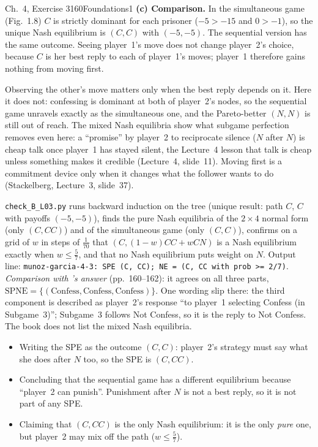 \begin{exsol}{\MG{} Ch.~4, Exercise 3}{160}{Foundations}{1}
\textbf{(c) Comparison.} In the simultaneous game (Fig.~1.8) $C$ is strictly dominant for each
prisoner ($-5 > -15$ and $0 > -1$), so the unique Nash equilibrium is $(C,C)$ with $(-5,-5)$. The
sequential version has the same outcome. Seeing player~1's move does not change player~2's
choice, because $C$ is her best reply to each of player~1's moves; player~1 therefore gains
nothing from moving first.

\interp Observing the other's move matters only when the best reply depends on it. Here it does
not: confessing is dominant at both of player~2's nodes, so the sequential game unravels exactly
as the simultaneous one, and the Pareto-better $(N,N)$ is still out of reach. The mixed Nash
equilibria show what subgame perfection removes even here: a ``promise'' by player~2 to
reciprocate silence ($N$ after $N$) is cheap talk once player~1 has stayed silent, the Lecture~4
lesson that talk is cheap unless something makes it credible (Lecture~4, slide~11). Moving first
is a commitment device only when it changes what the follower wants to do (Stackelberg,
Lecture~3, slide~37).

\verify \texttt{check\_B\_L03.py} runs backward induction on the tree (unique result: path
$C$, $C$ with payoffs $(-5,-5)$), finds the pure Nash equilibria of the $2\times4$ normal form (only
$(C, CC)$) and of the simultaneous game (only $(C,C)$), confirms on a grid of $w$ in steps of
$\frac1{70}$ that $(C, (1-w)CC + wCN)$ is a Nash equilibrium exactly when $w \le \frac57$, and that
no Nash equilibrium puts weight on $N$. Output line: \texttt{munoz-garcia-4-3: SPE (C, CC); NE =
(C, CC with prob >= 2/7)}. \emph{Comparison with \MG{}'s answer} (pp.~160--162): it agrees on all
three parts, $\text{SPNE} = \{(\text{Confess}, \text{Confess}, \text{Confess})\}$. One wording slip
there: the third component is described as player~2's response ``to player~1 selecting Confess (in
Subgame~3)''; Subgame~3 follows Not Confess, so it is the reply to Not Confess. The book does not
list the mixed Nash equilibria.

\mistakes
\begin{itemize}
  \item Writing the SPE as the outcome $(C, C)$: player~2's strategy must say what she does after
  $N$ too, so the SPE is $(C, CC)$.
  \item Concluding that the sequential game has a different equilibrium because ``player~2 can
  punish''. Punishment after $N$ is not a best reply, so it is not part of any SPE.
  \item Claiming that $(C, CC)$ is the only Nash equilibrium: it is the only \emph{pure} one, but
  player~2 may mix off the path ($w \le \frac57$).
\end{itemize}

\end{exsol}
